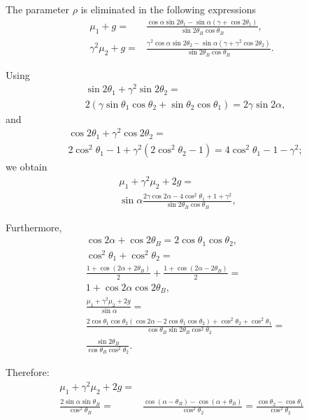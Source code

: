 \documentclass[preprint]{iucr}              %
\begin{document}
The parameter $\rho$ is eliminated in the following expressions 
\begin{align}
    \mu_1+g=&\frac{\cos\alpha\sin2\theta_1-\sin\alpha(\gamma+\cos2\theta_1)}{\sin2\theta_B\cos\theta_B},
    \\
    \gamma^2\mu_2+g=&\frac{\gamma^2\cos\alpha\sin2\theta_2-\sin\alpha(\gamma+\gamma^2\cos2\theta_2)}{\sin2\theta_B\cos\theta_B}.
\end{align}

Using
\begin{align}
    &\sin2\theta_1+\gamma^2\sin2\theta_2 = \nonumber \\
    &2(\gamma\sin\theta_1\cos\theta_2+\sin\theta_2\cos\theta_1) =2\gamma\sin2\alpha,
\end{align}
and
\begin{align}
    &\cos2\theta_1+\gamma^2\cos2\theta_2=\nonumber \\
    &2\cos^2\theta_1-1+\gamma^2(2\cos^2\theta_2-1)=
    4\cos^2\theta_1-1-\gamma^2; 
\end{align}
we obtain
\begin{align}
    \mu_1+\gamma^2\mu_2+2g =& \nonumber \\
    \sin\alpha
    \frac{2\gamma\cos2\alpha-4\cos^2\theta_1+1+\gamma^2}{\sin2\theta_B\cos\theta_B}, \nonumber 
\end{align}  
    
    
Furthermore, 
\begin{align}
    &\cos2\alpha+\cos2\theta_B = 
    2\cos\theta_1\cos\theta_2, \nonumber \\
    & \cos^2\theta_1+\cos^2\theta_2 = \nonumber \\
    & \frac{1+\cos(2\alpha+2\theta_B)}{2} + 
    \frac{1+\cos(2\alpha-2\theta_B)}{2} = \nonumber \\
    & 1+\cos2\alpha\cos2\theta_B, \nonumber \\
    &\frac{\mu_1+\gamma^2\mu_2+2g}{\sin\alpha} = \nonumber \\
    & \frac{2\cos\theta_1\cos\theta_2(\cos2\alpha-2\cos\theta_1\cos\theta_2)+\cos^2\theta_2+\cos^2\theta_1}{\cos\theta_B\sin2\theta_B\cos^2\theta_2} = \nonumber \\
    & \frac{\sin2\theta_B}{\cos\theta_B\cos^2\theta_2}. \nonumber 
\end{align}

Therefore:
\begin{align}
    \mu_1+\gamma^2\mu_2+2g = & \nonumber \\
    \frac{2\sin\alpha\sin\theta_B}{\cos^2\theta_B} = &
    \frac{\cos(\alpha-\theta_B)-\cos(\alpha+\theta_B)}{\cos^2\theta_2}=
    \frac{\cos\theta_2-\cos\theta_1}{\cos^2\theta_2}
\end{align}
\end{document}
